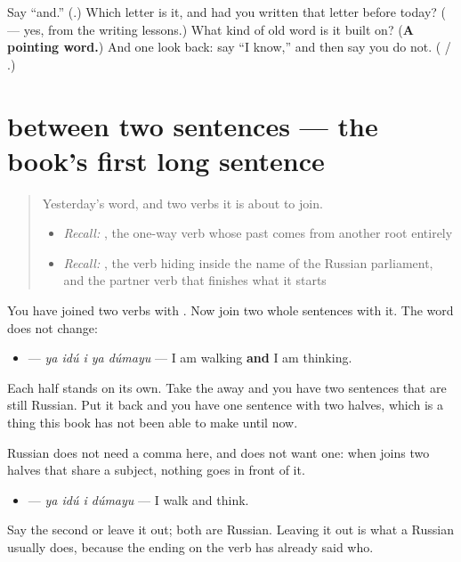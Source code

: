 \begin{tcolorbox}[breakable,colback=teal!4,colframe=teal!35!black,title={Before you move on}]
Say \textquotedblleft{}and.\textquotedblright{} (\textbf{}.) Which letter is it, and had you written that letter before today? (\textbf{} — yes, from the writing lessons.) What kind of old word is it built on? (\textbf{A pointing word.}) And one look back: say \textquotedblleft{}I know,\textquotedblright{} and then say you do not. (\textbf{ } / \textbf{  }.)
\end{tcolorbox}
\section[\texorpdfstring{… \ru{и} … (… i …)}{… и … (… i …)}]{ between two sentences — the book's first long sentence}

\label{lesson:RU-C16-i-predlozheniya}



\begin{quote}
Yesterday's word, and two verbs it is about to join.

\begin{itemize}
\raggedright
  \item \emph{Recall:} \emph{}, the one-way verb whose past comes from another root entirely
  \item \emph{Recall:} \emph{}, the verb hiding inside the name of the Russian parliament, and the partner verb that finishes what it starts
\end{itemize}
\end{quote}

\begin{grammarlens}[title={Grammar lens — one word, any size of piece}]
You have joined two verbs with \textbf{}. Now join two whole sentences with it. The word does not change:

\begin{itemize}
\raggedright
  \item \textbf{    } — \emph{ya idú i ya dúmayu} — I am walking \textbf{and} I am thinking.
\end{itemize}

Each half stands on its own. Take the \textbf{} away and you have two sentences that are still Russian. Put it back and you have one sentence with two halves, which is a thing this book has not been able to make until now.

Russian does not need a comma here, and does not want one: when \textbf{} joins two halves that share a subject, nothing goes in front of it.

\begin{itemize}
\raggedright
  \item \textbf{   } — \emph{ya idú i dúmayu} — I walk and think.
\end{itemize}

Say the second \textbf{} or leave it out; both are Russian. Leaving it out is what a Russian usually does, because the ending on the verb has already said who.
\end{grammarlens}

